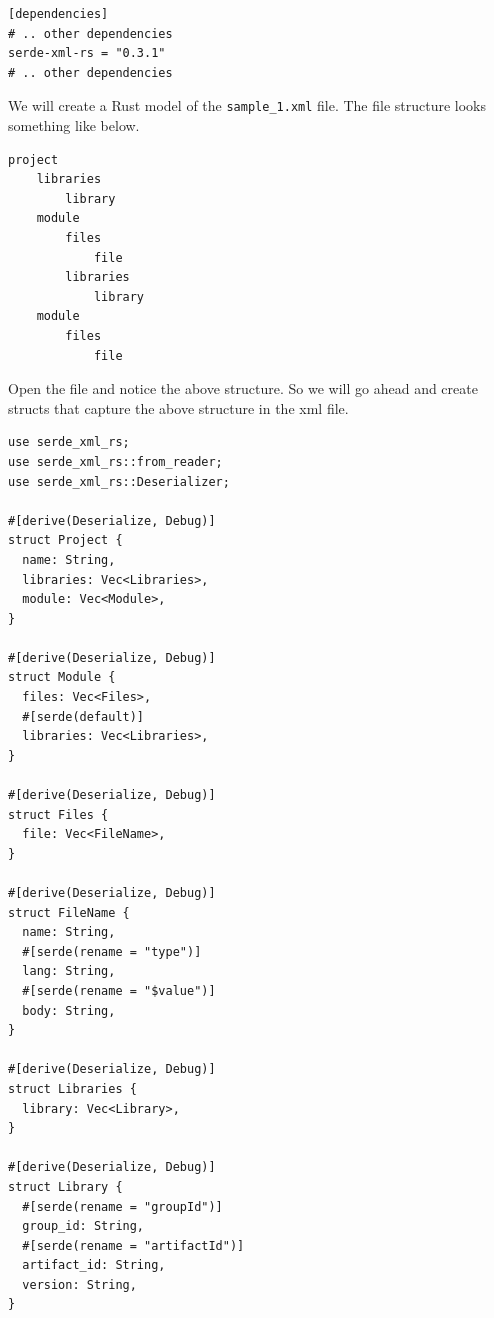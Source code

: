 \documentclass{book}
\begin{document}
\begin{lstlisting}[caption={chapter4\\/working\_with\_data\\/data\_formats\\/Cargo\\.toml},basicstyle=\small]
[dependencies]
# .. other dependencies
serde-xml-rs = "0.3.1"
# .. other dependencies
\end{lstlisting}

We will create a Rust model of the \lstinline{sample_1.xml} file. The file structure looks something like below.

\begin{lstlisting}[caption={chapter4\\/working\_with\_data\\/data\_formats\\/Cargo\\.toml},basicstyle=\small]
project
    libraries
        library 
    module
        files
            file
        libraries
            library
    module
        files
            file
\end{lstlisting}

Open the file and notice the above structure. So we will go ahead and create structs that capture the above structure in the xml file.

\begin{lstlisting}[caption={chapter4\\/working\_with\_data\\/data\_formats\\/src\\/xmlreading\\.rs},basicstyle=\small]
use serde_xml_rs;
use serde_xml_rs::from_reader;
use serde_xml_rs::Deserializer;

#[derive(Deserialize, Debug)]
struct Project {
  name: String,
  libraries: Vec<Libraries>,
  module: Vec<Module>,
}

#[derive(Deserialize, Debug)]
struct Module {
  files: Vec<Files>,
  #[serde(default)]
  libraries: Vec<Libraries>,
}

#[derive(Deserialize, Debug)]
struct Files {
  file: Vec<FileName>,
}

#[derive(Deserialize, Debug)]
struct FileName {
  name: String,
  #[serde(rename = "type")]
  lang: String,
  #[serde(rename = "$value")]
  body: String,
}

#[derive(Deserialize, Debug)]
struct Libraries {
  library: Vec<Library>,
}

#[derive(Deserialize, Debug)]
struct Library {
  #[serde(rename = "groupId")]
  group_id: String,
  #[serde(rename = "artifactId")]
  artifact_id: String,
  version: String,
}
\end{lstlisting}
\end{document}
